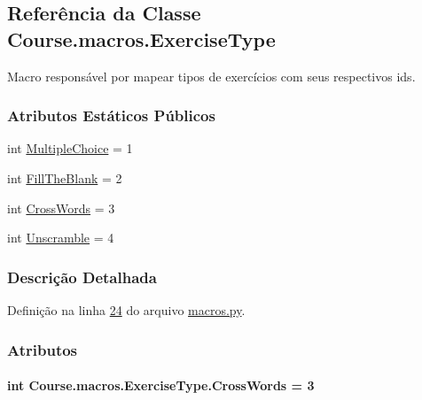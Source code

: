 \hypertarget{classCourse_1_1macros_1_1ExerciseType}{}\subsection{Referência da Classe Course.\+macros.\+Exercise\+Type}
\label{classCourse_1_1macros_1_1ExerciseType}


Macro responsável por mapear tipos de exercícios com seus respectivos ids.  


\subsubsection*{Atributos Estáticos Públicos}
\begin{DoxyCompactItemize}
\item 
int \hyperlink{classCourse_1_1macros_1_1ExerciseType_a0ad70d05309ba8aacd0a808e20089a9f}{Multiple\+Choice} = 1
\item 
int \hyperlink{classCourse_1_1macros_1_1ExerciseType_a5e880e89e6942b6cc6da78e9443aaabf}{Fill\+The\+Blank} = 2
\item 
int \hyperlink{classCourse_1_1macros_1_1ExerciseType_a3717c38ca7f35c859d7d6759d456a0c9}{Cross\+Words} = 3
\item 
int \hyperlink{classCourse_1_1macros_1_1ExerciseType_a5d5313adddb807b0cac94f5da44af978}{Unscramble} = 4
\end{DoxyCompactItemize}


\subsubsection{Descrição Detalhada}


Definição na linha \hyperlink{macros_8py_source_l00024}{24} do arquivo \hyperlink{macros_8py_source}{macros.\+py}.



\subsubsection{Atributos}
\hypertarget{classCourse_1_1macros_1_1ExerciseType_a3717c38ca7f35c859d7d6759d456a0c9}{}
\paragraph[{Cross\+Words}]{\setlength{\rightskip}{0pt plus 5cm}int Course.\+macros.\+Exercise\+Type.\+Cross\+Words = 3\hspace{0.3cm}{\ttfamily [static]}}\label{classCourse_1_1macros_1_1ExerciseType_a3717c38ca7f35c859d7d6759d456a0c9}


